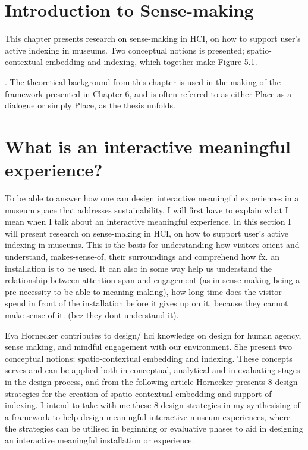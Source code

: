 \section{Introduction to Sense-making}

This chapter presents research on sense-making in HCI, on how to support user’s active indexing in museums. Two conceptual notions is presented; spatio-contextual embedding and indexing, which together make Figure 5.1. 



. The theoretical background from this chapter is used in the making of the framework presented in Chapter 6, and is often referred to as either Place as a dialogue or simply Place, as the thesis unfolds. 

\section{What is an interactive meaningful experience?}

To be able to answer how one can design interactive meaningful experiences in a museum space that addresses sustainability, I will first have to explain what I mean when I talk about an interactive meaningful experience. In this section I will present research on sense-making in HCI, on how to support user’s active indexing in museums. This is the basis for understanding how visitors orient and understand, makes-sense-of, their surroundings and comprehend how fx. an installation is to be used. It can also in some way help us understand the relationship between attention span and engagement (as in sense-making being a pre-necessity to be able to meaning-making), how long time does the visitor spend in front of the installation before it gives up on it, because they cannot make sense of it. (bcz they dont understand it).

Eva Hornecker contributes to design/ hci knowledge on design for human agency, sense making, and mindful engagement with our environment. She present two conceptual notions; spatio-contextual embedding and indexing. These concepts serves and can be applied both in conceptual, analytical and in evaluating stages in the design process, and from the following article Hornecker presents 8 design strategies for the creation of spatio-contextual embedding and support of indexing. I intend to take with me these 8 design strategies in my synthesising of a framework to help design meaningful interactive museum experiences, where the strategies can be utilised in beginning or evaluative phases to aid in designing an interactive meaningful installation or experience.


